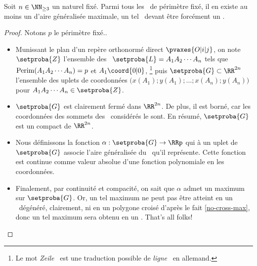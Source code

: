 

\begin{fact} \label{suff-cond}
    Soit $n \in \NN_{\geq3}$ un naturel fixé.
    Parmi tous les \ncycles\ de périmètre fixé, il en existe au moins un d'aire généralisée maximale, un tel \ncycle\ devant être forcément un \ngone.
\end{fact}


\begin{proof}
	Notons $p$ le périmètre fixé..
    \begin{itemize}
        \item Munissant le plan d'un repère orthonormé direct $\pvaxes{O | i | j}$, on note $\setproba{Z}$ l'ensemble des \ncycles\ $\setproba{L} = A_1 A_2 \cdots A_n$ tels que
        $\mathrm{Perim}(A_1 A_2 \cdots A_n) = p$
        et
        $A_1\coord{0 | 0}$,%
        \footnote{
        	Le mot \og \emph{Zeile} \fg\ est une traduction possible de \og \emph{ligne} \fg\ en allemand.
        }
        puis $\setproba{G} \subset \RR^{2n}$ l'ensemble des uplets de coordonnées $\big( x(A_1) ; y(A_1) ; \dots ; x(A_n) ; y(A_n) \big)$ pour $A_1 A_2 \cdots A_n \in \setproba{Z}$.


        \item $\setproba{G}$ est clairement fermé dans $\RR^{2n}$.
        De plus, il est borné, car les coordonnées des sommets des \ncycles\ considérés le sont.
        En résumé, $\setproba{G}$ est un compact de $\RR^{2n}$.


        \item Nous définissons la fonction $\alpha: \setproba{G} \rightarrow \RRp$ qui à un uplet de $\setproba{G}$ associe l'aire généralisée du \ncycle\ qu'il représente.
        Cette fonction est continue comme valeur absolue d'une fonction polynomiale en les coordonnées.


        \item Finalement, par continuité et compacité, on sait que $\alpha$ admet un maximum sur $\setproba{G}$.
        Or, un tel maximum ne peut pas être atteint en un \ncycle\ dégénéré, clairement, ni en un polygone croisé d'après le fait \ref{no-cross-max}, donc un tel maximum sera obtenu en un \ngone. That's all folks!
    \end{itemize}
\end{proof}
